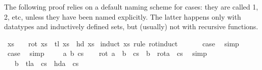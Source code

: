 \begin{isabellebody}
\begin{isamarkuptext}
\begin{isabelle}
\end{isabelle}
The following proof relies on a default naming scheme for cases: they are
called 1, 2, etc, unless they have been named explicitly. The latter happens
only with datatypes and inductively defined sets, but (usually)
not with recursive functions.%
\end{isamarkuptext}%
\isamarkuptrue%
\isamarkupfalse%
\ {}xs\ {}\ {}{}\ {}\ rot\ xs\ {}\ tl\ xs\ {}\ {}hd\ xs{}{}\isanewline
%
\isadelimproof
%
\endisadelimproof
%
\isatagproof
{}\isamarkupfalse%
\ {}induct\ xs\ rule{}\ rot{}induct{}\isanewline
\ \ \isamarkupfalse%
\ {}\ \isamarkupfalse%
\ {}case\ \isamarkupfalse%
\ simp\isanewline
{}\isamarkupfalse%
\isanewline
\ \ \isamarkupfalse%
\ {}\ \isamarkupfalse%
\ {}case\ \isamarkupfalse%
\ simp\isanewline
{}\isamarkupfalse%
\isanewline
\ \ \isamarkupfalse%
\ {}{}\ a\ b\ cs{}\isanewline
\ \ \isamarkupfalse%
\ {}rot\ {}a\ {}\ b\ {}\ cs{}\ {}\ b\ {}\ rot{}a\ {}\ cs{}{}\ \isamarkupfalse%
\ simp\isanewline
\ \ \isamarkupfalse%
\ \isamarkupfalse%
\ {}{}\ {}\ b\ {}\ tl{}a\ {}\ cs{}\ {}\ {}hd{}a\ {}\ cs{}{}{}\ \isamarkupfalse%

\end{isabellebody}
